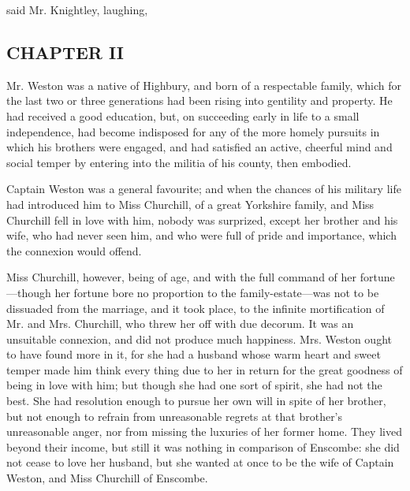 
 said Mr. Knightley, laughing, 

\subsection[chapter-ii]{\useURL[url2][][][]\from[url2]CHAPTER II}

Mr. Weston was a native of Highbury, and born of a respectable family, which for the last two or three generations had been rising into gentility and property. He had received a good education, but, on succeeding early in life to a small independence, had become indisposed for any of the more homely pursuits in which his brothers were engaged, and had satisfied an active, cheerful mind and social temper by entering into the militia of his county, then embodied.

Captain Weston was a general favourite; and when the chances of his military life had introduced him to Miss Churchill, of a great Yorkshire family, and Miss Churchill fell in love with him, nobody was surprized, except her brother and his wife, who had never seen him, and who were full of pride and importance, which the connexion would offend.

Miss Churchill, however, being of age, and with the full command of her fortune---though her fortune bore no proportion to the family-estate---was not to be dissuaded from the marriage, and it took place, to the infinite mortification of Mr. and Mrs. Churchill, who threw her off with due decorum. It was an unsuitable connexion, and did not produce much happiness. Mrs. Weston ought to have found more in it, for she had a husband whose warm heart and sweet temper made him think every thing due to her in return for the great goodness of being in love with him; but though she had one sort of spirit, she had not the best. She had resolution enough to pursue her own will in spite of her brother, but not enough to refrain from unreasonable regrets at that brother's unreasonable anger, nor from missing the luxuries of her former home. They lived beyond their income, but still it was nothing in comparison of Enscombe: she did not cease to love her husband, but she wanted at once to be the wife of Captain Weston, and Miss Churchill of Enscombe.

